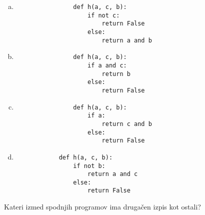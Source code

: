 \documentclass[arhiv, 10pt]{../izpit}
\begin{document}
        \begin{multicols}{2}
        \begin{enumerate}[(a)]
\item 
                \begin{verbatim}
                def h(a, c, b):
                    if not c:
                        return False
                    else:
                        return a and b
                \end{verbatim}
            
\item 
                \begin{verbatim}
                def h(a, c, b):
                    if a and c:
                        return b
                    else:
                        return False
                \end{verbatim}
            
\item 
                \begin{verbatim}
                def h(a, c, b):
                    if a:
                        return c and b
                    else:
                        return False
                \end{verbatim}
            
\item 
            \begin{verbatim}
            def h(a, c, b):
                if not b:
                    return a and c
                else:
                    return False
            \end{verbatim}
        
\end{enumerate}

        \end{multicols}
    
        \naloga*
        
        Kateri izmed spodnjih programov ima drugačen izpis kot ostali?
    
\end{document}
